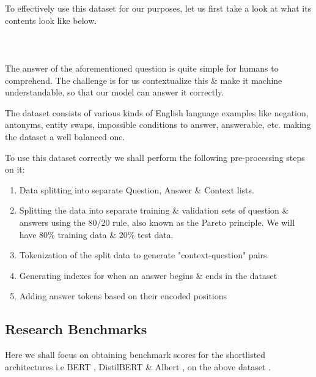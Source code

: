 \documentclass[11pt]{article}
\begin{document}
	To effectively use this dataset for our purposes, let us first take a look at what its contents look like below.\\ \\
	\noindent{}
	\\ \\
	
	The answer of the aforementioned question is quite simple for humans to comprehend. The challenge is for us contextualize this \& make it machine understandable, so that our model can answer it correctly.
	
	The dataset consists of various kinds of English language examples like negation, antonyms, entity swaps, impossible conditions to answer, answerable, etc. making the dataset a well balanced one. 
	
	To use this dataset correctly we shall perform the following pre-processing steps on it:
	
	\begin{enumerate}
		\item Data splitting into separate Question, Answer \& Context lists.
		\item Splitting the data into separate training \& validation sets of  question \& answers using the 80/20 rule, also known as the Pareto principle. We will have 80\% training data \& 20\% test data.
		\item Tokenization of the split data to generate "context-question" pairs
		\item Generating indexes for when an answer begins \& ends in the dataset
		\item Adding answer tokens based on their encoded positions
	\end{enumerate}	
	\subsection{Research Benchmarks}\label{benchmarks}
	Here we shall focus on obtaining benchmark scores for the shortlisted architectures i.e BERT \citep{bert}, DistilBERT \citep{distil} \& Albert \cite{albert}, on the above dataset \citep{dataset}. 
	
\end{document}
